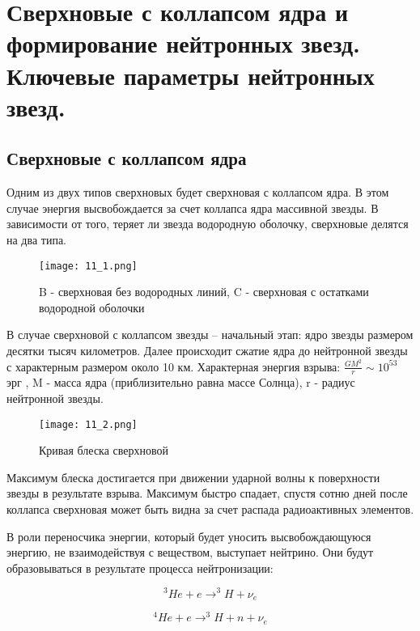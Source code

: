
\parindent=1cm

\section{Сверхновые с коллапсом ядра и формирование нейтронных звезд. Ключевые параметры
нейтронных звезд.}

\subsection{Сверхновые с коллапсом ядра}
Одним из двух типов сверхновых будет сверхновая с коллапсом ядра. В этом случае энергия высвобождается за счет коллапса ядра массивной звезды. В зависимости от того, теряет ли звезда водородную оболочку, сверхновые делятся на два типа.

\begin{figure}[H]
\centering
\texttt{[image: 11\_1.png]}
\caption{B - сверхновая без водородных линий, C - сверхновая с остатками водородной оболочки}
\end{figure}

В случае сверхновой с коллапсом звезды -- начальный этап: ядро звезды размером десятки тысяч километров. Далее происходит сжатие ядра до нейтронной звезды с характерным размером около 10 км. Характерная энергия взрыва: $\frac{GM^2}{r} \sim 10^{53}$ эрг , M -  масса ядра (приблизительно равна массе Солнца), r - радиус нейтронной звезды. 

\begin{figure}[H]
\centering
\texttt{[image: 11\_2.png]}
\caption{Кривая блеска сверхновой}
\end{figure}


Максимум блеска достигается при движении ударной волны к поверхности звезды в результате взрыва. Максимум быстро спадает, спустя сотню дней после коллапса сверхновая может быть видна за счет распада радиоактивных элементов. 



В роли переносчика энергии, который будет уносить высвобождающуюся энергию, не взаимодействуя с веществом, выступает нейтрино. Они будут образовываться в результате процесса нейтронизации:

\begin{equation*}
    ^3He + e \rightarrow ^3H + \nu_e
\end{equation*}

\begin{equation*}
    ^4He + e \rightarrow ^3H + n + \nu_e
\end{equation*}

